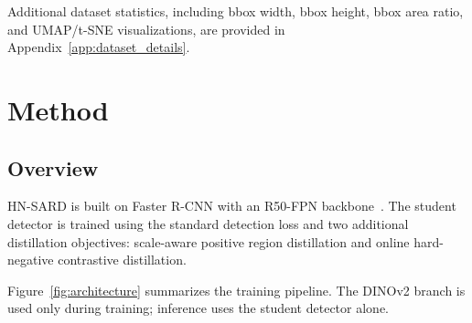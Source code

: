 \documentclass[conference,a4paper]{IEEEtran}
\begin{document}
\noindent
Additional dataset statistics, including bbox width, bbox height, bbox area ratio, and UMAP/t-SNE visualizations, are provided in Appendix~\ref{app:dataset_details}.
\FloatBarrier

\section{Method}

\subsection{Overview}

HN-SARD is built on Faster R-CNN with an R50-FPN backbone~\cite{ren2015faster,lin2017feature}.
The student detector is trained using the standard detection loss and two additional distillation objectives:
scale-aware positive region distillation and online hard-negative contrastive distillation.

Figure~\ref{fig:architecture} summarizes the training pipeline.
The DINOv2 branch is used only during training; inference uses the student detector alone.
\end{document}
